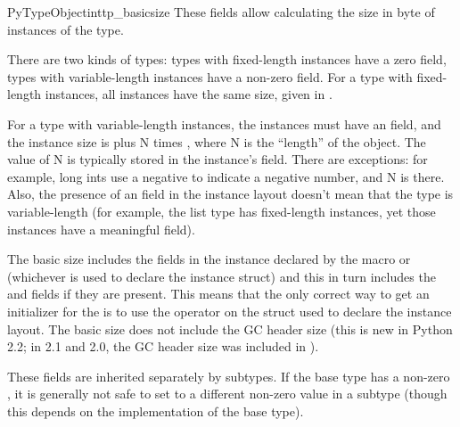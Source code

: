 \begin{cmemberdesc}{PyTypeObject}{int}{tp_basicsize}
  These fields allow calculating the size in byte of instances of
  the type.

  There are two kinds of types: types with fixed-length instances have
  a zero  field, types with variable-length
  instances have a non-zero  field.  For a type
  with fixed-length instances, all instances have the same size,
  given in .

  For a type with variable-length instances, the instances must have
  an  field, and the instance size is
   plus N times , where N is
  the ``length'' of the object.  The value of N is typically stored in
  the instance's  field.  There are exceptions:  for
  example, long ints use a negative  to indicate a
  negative number, and N is  there.  Also,
  the presence of an  field in the instance layout
  doesn't mean that the type is variable-length (for example, the list
  type has fixed-length instances, yet those instances have a
  meaningful  field).

  The basic size includes the fields in the instance declared by the
  macro  or
   (whichever is used to declare the
  instance struct) and this in turn includes the  and
   fields if they are present.  This means that the
  only correct way to get an initializer for the 
  is to use the  operator on the struct used to
  declare the instance layout.  The basic size does not include the GC
  header size (this is new in Python 2.2; in 2.1 and 2.0, the GC
  header size was included in ).

  These fields are inherited separately by subtypes.  If the base type
  has a non-zero , it is generally not safe to set
   to a different non-zero value in a subtype
  (though this depends on the implementation of the base type).
\end{cmemberdesc}

